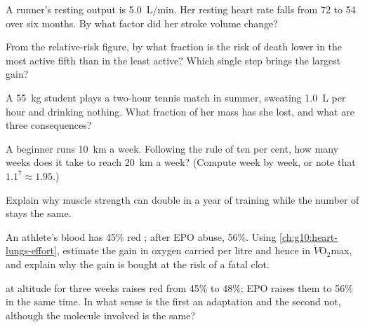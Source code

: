 \begin{exercise}[$\star\star$]\label{exo:g10:sport-and-health:7}
A runner's resting output is \qty{5.0}{L/min}. Her resting heart rate
falls from 72 to 54 over six months. By what factor did her stroke
volume change?
\end{exercise}

\begin{exercise}[$\star\star$]\label{exo:g10:sport-and-health:8}
From the relative-risk figure, by what fraction is the risk of death
lower in the most active fifth than in the least active? Which single
step brings the largest gain?
\end{exercise}

\begin{exercise}[$\star\star$]\label{exo:g10:sport-and-health:9}
A \qty{55}{kg} student plays a two-hour tennis match in summer,
sweating \qty{1.0}{L} per hour and drinking nothing. What fraction of
her mass has she lost, and what are three consequences?
\end{exercise}

\begin{exercise}[$\star\star$]\label{exo:g10:sport-and-health:10}
A beginner runs \qty{10}{km} a week. Following the rule of ten per
cent, how many weeks does it take to reach \qty{20}{km} a week?
(Compute week by week, or note that $1.1^7 \approx 1.95$.)
\end{exercise}

\begin{exercise}[$\star\star$]\label{exo:g10:sport-and-health:11}
Explain why muscle strength can double in a year of training while
the number of  stays the same.
\end{exercise}

\begin{exercise}[$\star\star\star$]\label{exo:g10:sport-and-health:12}
An athlete's blood has 45\% red ; after EPO abuse, 56\%. Using
\cref{ch:g10:heart-lungs-effort}, estimate the gain in oxygen carried
per litre and hence in $\dot V\!\mathrm{O_2}$max, and explain why the
gain is bought at the risk of a fatal clot.
\end{exercise}

\begin{exercise}[$\star\star\star$]\label{exo:g10:sport-and-health:13}
 at altitude for three weeks raises red  from 45\% to
48\%; EPO raises them to 56\% in the same time. In what sense is the
first an adaptation and the second not, although the molecule involved
is the same?
\end{exercise}

